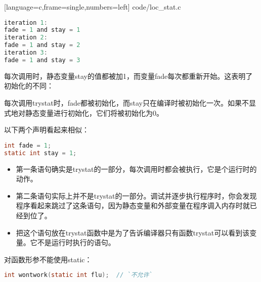 \begin{frame}\ft{\subsecname}

[language=c,frame=single,numbers=left]
{code/loc_stat.c}
\end{frame}

\begin{frame}[fragile]\ft{\subsecname}
  \begin{lstlisting}[language=c,frame=single]
iteration 1: 
fade = 1 and stay = 1
iteration 2: 
fade = 1 and stay = 2
iteration 3: 
fade = 1 and stay = 3    
  \end{lstlisting}
\end{frame}

\begin{frame}[fragile]\ft{\subsecname}
每次调用时，静态变量{\tf stay}的值都被加1，而变量{\tf fade}每次都重新开始。这表明了初始化的不同：\vspace{0.1in}

\textcolor{acolor1}{每次调用{\tf trystat}时，{\tf fade}都被初始化，而{\tf stay}只在编译时被初始化一次。如果不显式地对静态变量进行初始化，它们将被初始化为0。}
\end{frame}

\begin{frame}[fragile]\ft{\subsecname}
以下两个声明看起来相似：
\begin{lstlisting}[language=c,frame=single]
int fade = 1;
static int stay = 1;  
\end{lstlisting}
\begin{itemize}
\item 第一条语句确实是{\tf trystat}的一部分，每次调用时都会被执行，它是个运行时的动作。\\[0.1in]
\item 第二条语句实际上并不是{\tf trystat}的一部分。调试并逐步执行程序时，你会发现程序看起来跳过了这条语句，因为静态变量和外部变量在程序调入内存时就已经到位了。\\[0.1in]
\item[] 把这个语句放在{\tf trystat}函数中是为了告诉编译器只有函数{\tf trystat}可以看到该变量。它不是运行时执行的语句。
\end{itemize}
\end{frame}

\begin{frame}[fragile]\ft{\subsecname}
对函数形参不能使用{\tf static}：
\begin{lstlisting}[language=c,frame=single]
int wontwork(static int flu);  // `不允许`
\end{lstlisting}
\end{frame}


